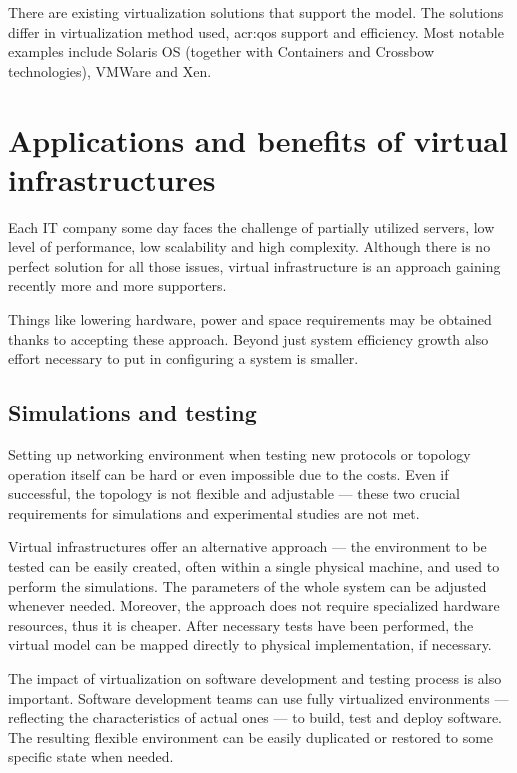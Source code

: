 \documentclass[11pt]{book}
\begin{document}
        There are existing virtualization solutions that support the model. The solutions differ in virtualization
        method used, \gls{acr:qos} support and efficiency. Most notable examples include Solaris OS (together with
        Containers and Crossbow technologies), VMWare and Xen.  %


    \section{Applications and benefits of virtual infrastructures}
    \label{sec:ctx:infra}

      Each IT company some day faces the challenge of partially utilized servers, low level of performance, low
      scalability and high complexity. Although there is no perfect solution for all those issues, virtual
      infrastructure is an approach gaining recently more and more supporters.  

      Things like lowering hardware, power and space requirements may be obtained thanks to accepting these approach.
      Beyond just system efficiency growth also effort necessary to put in configuring a system is smaller. 


      \subsection{Simulations and testing}

        Setting up networking environment when testing new protocols or topology operation itself can be hard or even
        impossible due to the costs. Even if successful, the topology is not flexible and adjustable --- these two
        crucial requirements for simulations and experimental studies are not met.

        
        Virtual infrastructures offer an alternative approach --- the environment to be tested can be easily created,
        often within a single physical machine, and used to perform the simulations. The parameters of the whole system
        can be adjusted whenever needed. Moreover, the approach does not require specialized hardware resources, thus it
        is cheaper. After necessary tests have been performed, the virtual model can be mapped directly to physical
        implementation, if necessary.

        The impact of virtualization on software development and testing process is also important. Software development
        teams can use fully virtualized environments --- reflecting the characteristics of actual ones --- to build,
        test and deploy software. The resulting flexible environment can be easily duplicated or restored to some
        specific state when needed.
\end{document}
